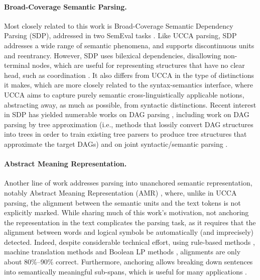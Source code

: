 \documentclass[11pt]{article}
\newcommand{\secref}[1]{Section~\ref{#1}}
\begin{document}
\paragraph{Broad-Coverage Semantic Parsing.}
Most closely related to this work is Broad-Coverage Semantic Dependency Parsing (SDP),
addressed in two SemEval tasks \cite{oepen2014semeval,oepen2015semeval}.
Like UCCA parsing, SDP addresses a wide range of semantic phenomena,
and supports discontinuous units and reentrancy.
However, SDP uses bilexical dependencies, disallowing non-terminal nodes, which
are useful for representing structures that have no clear head, such as coordination
\cite[see \secref{sec:introduction}]{Ivanova2012who}. It also differs from UCCA in the type
of distinctions it makes, which are more closely related to the syntax-semantics interface,
where UCCA aims to capture purely semantic cross-linguistically applicable notions, abstracting
away, as much as possible, from syntactic distinctions.
Recent interest in SDP has yielded numerable works on DAG parsing
\cite{ribeyre-villemontedelaclergerie-seddah:2014:SemEval,thomson-EtAl:2014:SemEval,almeida-martins:2015:SemEval,du-EtAl:2015:SemEval}, including work on DAG parsing
by tree approximation (i.e., methods that lossily convert DAG structures
into trees in order to train existing tree parsers to produce tree structures
that approximate the target DAGs) \cite{agic-koller:2014:SemEval,schluter-EtAl:2014:SemEval}
and on joint syntactic/semantic parsing
\cite{henderson2013multilingual,swayamdipta-EtAl:2016:CoNLL}.

\paragraph{Abstract Meaning Representation.}
Another line of work addresses parsing into unanchored
semantic representation, notably Abstract Meaning Representation (AMR)
\cite{flanigan2014discriminative,vanderwende2015amr,pust2015parsing,artzi2015broad},
where, unlike in UCCA parsing, the alignment between the semantic units and the text tokens
is not explicitly marked.
While sharing much of this work's motivation, not anchoring the representation in the text
complicates the parsing task, as it requires
that the alignment between words and logical symbols be automatically
(and imprecisely) detected. Indeed, despite considerable technical effort,
using rule-based methods \cite{flanigan2014discriminative}, machine
translation methods \cite{pourdamghani2014aligning} and Boolean LP methods
\cite{werling2015robust}, alignments are only about 80\%--90\% correct.
Furthermore, anchoring allows breaking down sentences into semantically meaningful sub-spans,
which is useful for many applications \cite{fernandez2015parsing,birch2016hume}.
\end{document}
